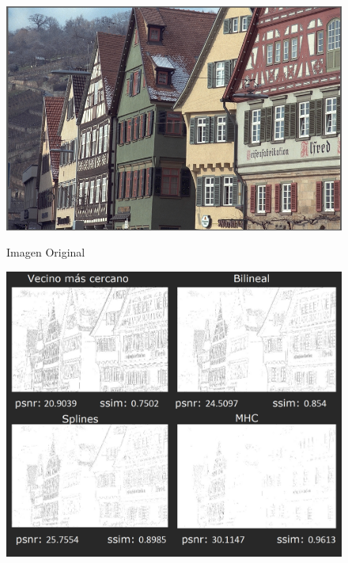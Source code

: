\documentclass[a4paper]{article}
\begin{document}
\begin{figure}[h!]
    \caption{Imagen Original}
    \begin{center}
    \includegraphics[scale=0.15]{imagenes/comparacion/04/img4}
    \label{imagen4}
  \end{center}
\end{figure}

\begin{figure}[h!]
    \caption{}
    \begin{center}
    \includegraphics[scale=0.40]{imagenes/comparacion/04/collage}
    \label{imagen4}
  \end{center}
\end{figure}
\end{document}
